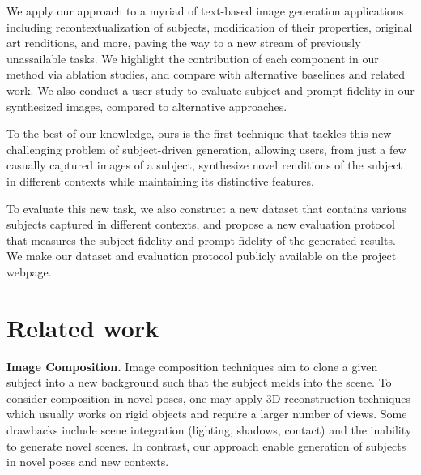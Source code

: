 We apply our approach to a myriad of text-based image generation applications including recontextualization of subjects, modification of their properties, original art renditions, and more, paving the way to a new stream of previously unassailable tasks. We highlight the contribution of each component in our method via ablation studies, and compare with alternative baselines and related work. We also conduct a user study to evaluate subject and prompt fidelity in our synthesized images, compared to alternative approaches.

To the best of our knowledge, ours is the first technique that tackles this new challenging problem of subject-driven generation, allowing users, from just a few casually captured images of a subject, synthesize novel renditions of the subject in different contexts while maintaining its distinctive features.

To evaluate this new task, we also construct a new dataset that contains various subjects captured in different contexts, and propose a new evaluation protocol that measures the subject fidelity and prompt fidelity of the generated results. We make our dataset and evaluation protocol publicly available on the project webpage.

\section{Related work}

\textbf{Image Composition. } Image composition techniques \cite{wu2019gp,cong2020dovenet,lin2018st} aim to clone a given subject into a new background such that the subject melds into the scene. To consider composition in novel poses, one may apply 3D reconstruction techniques \cite{mildenhall2020nerf,Barron_2021_ICCV,boss2022samurai,verbin2021refnerf,poole2022dreamfusion} which usually works on rigid objects and require a larger number of views. Some drawbacks include scene integration (lighting, shadows, contact) and the inability to generate novel scenes. In contrast, our approach enable generation of subjects in novel poses and new contexts.

